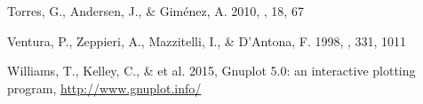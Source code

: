 \documentclass{aa}
\begin{document}
\begin{thebibliography}{71}
Torres, G., Andersen, J., \& Gim\'{e}nez, A. 2010, \aapr, 18, 67

{Ventura}, P., {Zeppieri}, A., {Mazzitelli}, I., \& {D'Antona}, F. 1998, \aap,
  331, 1011

{Williams}, T., {Kelley}, C., \& {et al.} 2015, Gnuplot 5.0: an interactive
  plotting program, \url{http://www.gnuplot.info/}

\end{thebibliography}
\end{document}

